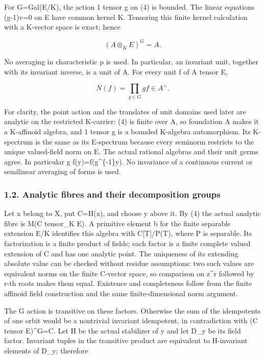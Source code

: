 \documentclass[
  10pt,
]{article}
\begin{document}
For G=Gal(E/K), the action 1 tensor g on (4) is bounded. The linear
equations (g-1)v=0 on E have common kernel K. Tensoring this finite
kernel calculation with a K-vector space is exact; hence

\[
 (A\otimes_K E)^G=A.                                       \tag{5}
\]

No averaging in characteristic p is used. In particular, an invariant
unit, together with its invariant inverse, is a unit of A. For every
unit f of A tensor E,

\[
N(f)=\prod_{g\in G}g f\in A^\times.                         \tag{6}
\]

For clarity, the point action and the translates of unit domains used
later are analytic on the restricted K-carrier: (4) is finite over A, so
foundation A makes it a K-affinoid algebra, and 1 tensor g is a bounded
K-algebra automorphism. Its K-spectrum is the same as its E-spectrum
because every seminorm restricts to the unique valued-field norm on E.
The actual rational algebras and their unit germs agree. In particular
\textbar g f(y)\textbar=\textbar f(g\^{}\{-1\}y)\textbar. No invariance
of a continuous current or semilinear averaging of forms is used.

\subsubsection{1.2. Analytic fibres and their decomposition
groups}\label{analytic-fibres-and-their-decomposition-groups}

Let x belong to X, put C=H(x), and choose y above it. By (4) the actual
analytic fibre is M(C tensor\_K E). A primitive element b for the finite
separable extension E/K identifies this algebra with C{[}T{]}/P(T),
where P is separable. Its factorization is a finite product of fields;
each factor is a finite complete valued extension of C and has one
analytic point. The uniqueness of its extending absolute value can be
checked without residue assumptions: two such values are equivalent
norms on the finite C-vector space, so comparison on z\^{}r followed by
r-th roots makes them equal. Existence and completeness follow from the
finite affinoid field construction and the same finite-dimensional norm
argument.

The G action is transitive on these factors. Otherwise the sum of the
idempotents of one orbit would be a nontrivial invariant idempotent, in
contradiction with (C tensor E)\^{}G=C. Let H be the actual stabilizer
of y and let D\_y be its field factor. Invariant tuples in the
transitive product are equivalent to H-invariant elements of D\_y;
therefore
\end{document}
